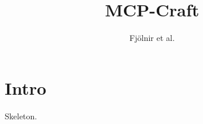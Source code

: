 \documentclass{article}
\title{MCP-Craft}
\author{Fj\"olnir et al.}
\begin{document}
\maketitle
\section{Intro} Skeleton.
\end{document}
